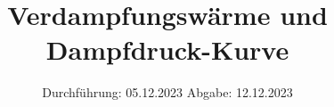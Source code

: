 
\usepackage{longtable}

\subject{V203}
\title{Verdampfungswärme und Dampfdruck-Kurve}
\date{%
  Durchführung: 05.12.2023
  \hspace{3em}
  Abgabe: 12.12.2023
}



\maketitle
\thispagestyle{empty}
\tableofcontents
\newpage






\printbibliography{}
\appendix
\setcounter{secnumdepth}{0}

